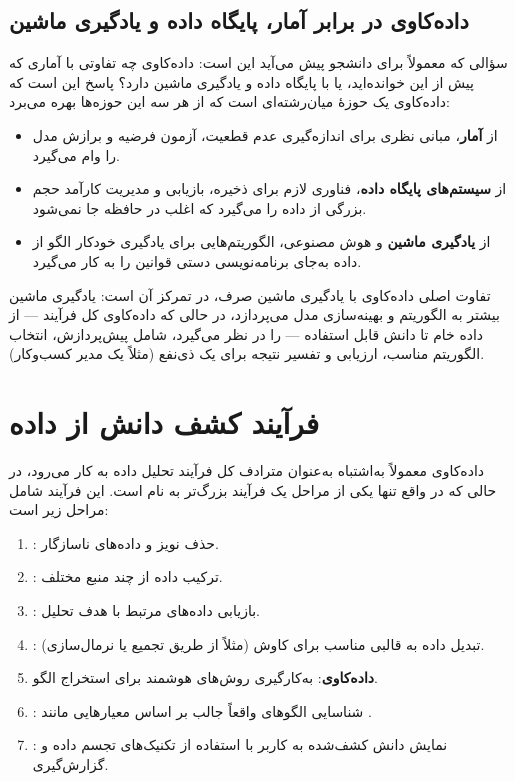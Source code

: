 \subsection{داده‌کاوی در برابر آمار، پایگاه داده و یادگیری ماشین}

سؤالی که معمولاً برای دانشجو پیش می‌آید این است: داده‌کاوی چه تفاوتی با آماری که
پیش از این خوانده‌اید، یا با پایگاه داده و یادگیری ماشین دارد؟ پاسخ این است که
داده‌کاوی یک حوزهٔ میان‌رشته‌ای است که از هر سه این حوزه‌ها بهره می‌برد:

\begin{itemize}
    \item از \textbf{آمار}، مبانی نظری برای اندازه‌گیری عدم قطعیت، آزمون فرضیه و
          برازش مدل را وام می‌گیرد.
    \item از \textbf{سیستم‌های پایگاه داده}، فناوری لازم برای ذخیره، بازیابی و
          مدیریت کارآمد حجم بزرگی از داده را می‌گیرد که اغلب در حافظه جا نمی‌شود.
    \item از \textbf{یادگیری ماشین} و هوش مصنوعی، الگوریتم‌هایی برای یادگیری خودکار
          الگو از داده به‌جای برنامه‌نویسی دستی قوانین را به کار می‌گیرد.
\end{itemize}

تفاوت اصلی داده‌کاوی با یادگیری ماشین صرف، در تمرکز آن است: یادگیری ماشین بیشتر
به الگوریتم و بهینه‌سازی مدل می‌پردازد، در حالی که داده‌کاوی کل فرآیند — از
داده خام تا دانش قابل استفاده — را در نظر می‌گیرد، شامل پیش‌پردازش، انتخاب
الگوریتم مناسب، ارزیابی و تفسیر نتیجه برای یک ذی‌نفع (مثلاً یک مدیر کسب‌وکار).

\section{فرآیند کشف دانش از داده}
\label{sec:kdd}

داده‌کاوی معمولاً به‌اشتباه به‌عنوان مترادف کل فرآیند تحلیل داده به کار می‌رود،
در حالی که در واقع تنها یکی از مراحل یک فرآیند بزرگ‌تر به نام
 است.
این فرآیند شامل مراحل زیر است:

\begin{enumerate}
    \item {}: حذف نویز و داده‌های ناسازگار.
    \item {}: ترکیب داده از چند منبع مختلف.
    \item {}: بازیابی داده‌های مرتبط با هدف تحلیل.
    \item {}: تبدیل داده به قالبی مناسب برای کاوش
          (مثلاً از طریق تجمیع یا نرمال‌سازی).
    \item \textbf{داده‌کاوی}: به‌کارگیری روش‌های هوشمند برای استخراج الگو.
    \item {}: شناسایی الگوهای واقعاً جالب بر اساس
          معیارهایی مانند .
    \item {}: نمایش دانش کشف‌شده به کاربر با
          استفاده از تکنیک‌های تجسم داده و گزارش‌گیری.
\end{enumerate}

